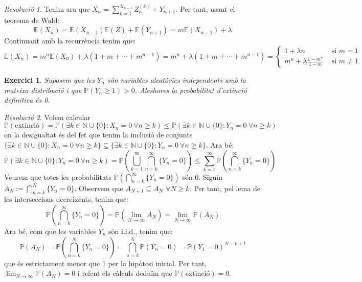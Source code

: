 \documentclass[10pt,a4paper]{article}
\newcommand{\NN}{\ensuremath{\mathbb{N}}} %
\newcommand{\Prob}{\ensuremath{\mathbb{P}}} %
\newcommand{\Exp}{\mathbb{E}} %
\newcommand{\iid}{i.i.d.} %
\newtheorem{exercici}{Exercici}
\theoremstyle{definition}
\theoremstyle{remark}
\newtheorem{res}{Resolució}
\begin{document}
\begin{res}
  Tenim ara que $X_n=\sum_{k=1}^{X_{n-1}}Z_n^{(k)}+Y_{n+1}$. Per tant, usant el teorema de Wald:
  $$\Exp\left(X_n\right)=\Exp(X_{n-1})\Exp(Z)+\Exp(Y_{n+1})=m\Exp(X_{n-1})+\lambda$$
  Continuant amb la recurrència tenim que:
  $$\Exp\left(X_n\right)=m^n\Exp(X_0)+\lambda(1+m+\cdots+m^{n-1})=m^n+\lambda(1+m+\cdots+m^{n-1})=
    \begin{cases}
      1+ \lambda n                 & \text{ si $m=1$}    \\
      m^n+\lambda\frac{1-m^n}{1-m} & \text{ si $m\ne 1$}
    \end{cases}$$

\end{res}
\begin{exercici}
  Suposem que les $Y_n$ són variables aleatòries independents amb la mateixa distribució i que $\Prob(Y_n\geq 1)>0$. Aleshores la probabilitat d'extinció definitiva és 0.
\end{exercici}
\begin{res}
  Volem calcular $$\Prob(\text{extinció})=\Prob\left(\exists k\in\NN\cup\{0\}:X_n=0\ \forall n\geq k\right)\leq\Prob\left(\exists k\in\NN\cup\{0\}:Y_n=0\ \forall n\geq k\right)$$
  on la desigualtat és del fet que tenim la inclusió de conjunts $\{\exists k\in\NN\cup\{0\}:X_n=0\ \forall n\geq k\}\subseteq\{\exists k\in\NN\cup\{0\}:Y_n=0\ \forall n\geq k\}$. Ara bé:
  $$\Prob\left(\exists k\in\NN\cup\{0\}:Y_n=0\ \forall n\geq k\right)=\Prob\left(\bigcup_{k=1}^\infty\bigcap_{n=k}^\infty\{Y_n=0\}\right)\leq\sum_{k=1}^\infty\Prob\left(\bigcap_{n=k}^\infty \{Y_n=0\}\right)$$
  Veurem que totes les probabilitats $\Prob\left(\bigcap_{n=k}^\infty \{Y_n=0\}\right)$ són 0. Siguin $A_N:=\bigcap_{n=k}^N \{Y_n=0\}$. Observem que $A_{N+1}\subseteq A_{N}$ $\forall N\geq k$. Per tant, pel lema de les interseccions decreixents, tenim que:
  $$\Prob\left(\bigcap_{n=k}^\infty \{Y_n=0\}\right)=\Prob\left(\lim_{N\to\infty}A_N\right)=\lim_{N\to\infty}\Prob(A_N)$$
  Ara bé, com que les variables $Y_n$ són \iid, tenim que:
  $$\Prob(A_N)=\Prob\left(\bigcap_{n=k}^N \{Y_n=0\}\right)=\bigcap_{n=k}^N \Prob\left(Y_n=0\right)={\Prob(Y_1=0)}^{N-k+1}$$
  que és estrictament menor que 1 per la hipòtesi inicial. Per tant, $\displaystyle\lim_{N\to\infty}\Prob(A_N)=0$ i refent els càlculs deduïm que $\Prob(\text{extinció})=0$.
\end{res}
\end{document}
